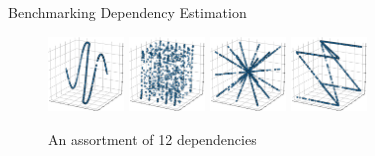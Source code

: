 \documentclass[16pt,usenames,dvipsnames, notheorems]{beamer}
\theoremstyle{definition}
\theoremstyle{example}
\theoremstyle{plain}
\begin{document}
\begin{frame}{Benchmarking Dependency Estimation}
\begin{figure}
	{\includegraphics[width=0.18\textwidth]{figures/Sine_1-3-00-crop-compressed.pdf}}
	\hfill
	{\includegraphics[width=0.18\textwidth]{figures/Sine_5-3-00-crop-compressed.pdf}}
	\hfill
	{\includegraphics[width=0.18\textwidth]{figures/Star-3-00-crop-compressed.pdf}}
	\hfill
	{\includegraphics[width=0.18\textwidth]{figures/Zinv-3-00-crop-compressed.pdf}}
	\caption{An assortment of 12 dependencies}
	\label{fig:deps-plot}
\end{figure}

\end{frame}
\end{document}
